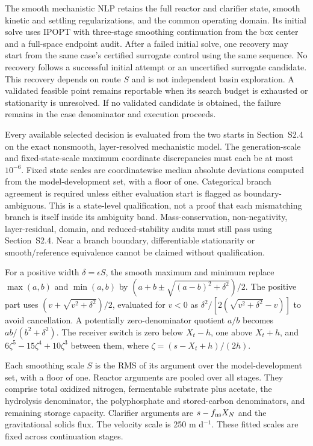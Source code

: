 \documentclass[a4paper,fleqn]{cas-sc}
\begin{document}
The smooth mechanistic NLP retains the full reactor and clarifier state, smooth kinetic and settling regularizations, and the common operating domain. Its initial solve uses IPOPT \citep{WachterBiegler2006} with three-stage smoothing continuation from the box center and a full-space endpoint audit. After a failed initial solve, one recovery may start from the same case's certified surrogate control using the same sequence. No recovery follows a successful initial attempt or an uncertified surrogate candidate. This recovery depends on route $S$ and is not independent basin exploration. A validated feasible point remains reportable when its search budget is exhausted or stationarity is unresolved. If no validated candidate is obtained, the failure remains in the case denominator and execution proceeds.

Every available selected decision is evaluated from the two starts in Section~S2.4 on the exact nonsmooth, layer-resolved mechanistic model. The generation-scale and fixed-state-scale maximum coordinate discrepancies must each be at most $10^{-6}$. Fixed state scales are coordinatewise median absolute deviations computed from the model-development set, with a floor of one. Categorical branch agreement is required unless either evaluation start is flagged as boundary-ambiguous. This is a state-level qualification, not a proof that each mismatching branch is itself inside its ambiguity band. Mass-conservation, non-negativity, layer-residual, domain, and reduced-stability audits must still pass using Section~S2.4. Near a branch boundary, differentiable stationarity or smooth/reference equivalence cannot be claimed without qualification.

For a positive width $\delta=\epsilon S$, the smooth maximum and minimum replace $\max(a,b)$ and $\min(a,b)$ by $(a+b\pm\sqrt{(a-b)^2+\delta^2})/2$. The positive part uses $(v+\sqrt{v^2+\delta^2})/2$, evaluated for $v<0$ as $\delta^2/[2(\sqrt{v^2+\delta^2}-v)]$ to avoid cancellation. A potentially zero-denominator quotient $a/b$ becomes $ab/(b^2+\delta^2)$. The receiver switch is zero below $X_t-h$, one above $X_t+h$, and $6\zeta^5-15\zeta^4+10\zeta^3$ between them, where $\zeta=(s-X_t+h)/(2h)$.

Each smoothing scale $S$ is the RMS of its argument over the model-development set, with a floor of one. Reactor arguments are pooled over all stages. They comprise total oxidized nitrogen, fermentable substrate plus acetate, the hydrolysis denominator, the polyphosphate and stored-carbon denominators, and remaining storage capacity. Clarifier arguments are $s-f_{\rm ns}X_N$ and the gravitational solids flux. The velocity scale is 250 m d$^{-1}$. These fitted scales are fixed across continuation stages.
\end{document}
